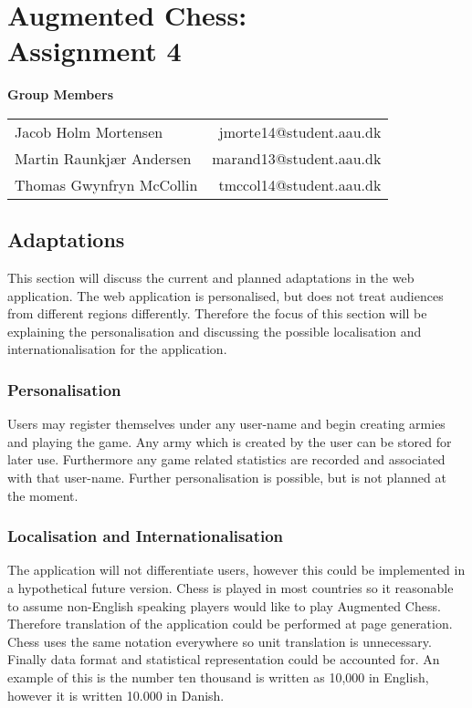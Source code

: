 \documentclass[10pt,a4paper]{report}
\begin{document}
\chapter{Augmented Chess:\\ Assignment 4}

\begin{center}
{\Large \textbf{Group Members}}

\begin{tabular}{l r}
Jacob Holm Mortensen		&	jmorte14@student.aau.dk\\
Martin Raunkjær Andersen	&	marand13@student.aau.dk\\
Thomas Gwynfryn McCollin	&	tmccol14@student.aau.dk
\end{tabular}
\end{center}

\section{Adaptations}
This section will discuss the current and planned adaptations in the web application. The web application is personalised, but does not treat audiences from different regions differently. Therefore the focus of this section will be explaining the personalisation and discussing the possible localisation and internationalisation for the application.

\subsection{Personalisation}
Users may register themselves under any user-name and begin creating armies and playing the game. Any army which is created by the user can be stored for later use. Furthermore any game related statistics are recorded and associated with that user-name. Further personalisation is possible, but is not planned at the moment.

\subsection{Localisation and Internationalisation}
The application will not differentiate users, however this could be implemented in a hypothetical future version. Chess is played in most countries so it reasonable to assume non-English speaking players would like to play Augmented Chess. Therefore translation of the application could be performed at page generation. Chess uses the same notation everywhere so unit translation is unnecessary. Finally data format and statistical representation could be accounted for. An example of this is the number ten thousand is written as 10,000 in English, however it is written 10.000 in Danish. 
\end{document}
